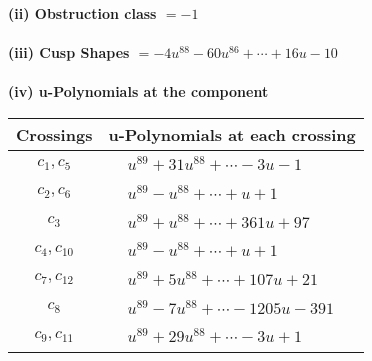 \documentclass[1p]{elsarticle_modified}
\theoremstyle{definition}
\begin{document}
\flushleft \textbf{(ii) Obstruction class $= -1$}\\~\\
\flushleft \textbf{(iii) Cusp Shapes $= -4 u^{88}-60 u^{86}+\cdots+16 u-10$}\\~\\
\newpage\renewcommand{\arraystretch}{1}
\flushleft \textbf{(iv) u-Polynomials at the component}\newline \\
\begin{tabular}{m{50pt}|m{274pt}}
Crossings & \hspace{64pt}u-Polynomials at each crossing \\
\hline $$\begin{aligned}c_{1},c_{5}\end{aligned}$$&$\begin{aligned}
&u^{89}+31 u^{88}+\cdots-3 u-1
\end{aligned}$\\
\hline $$\begin{aligned}c_{2},c_{6}\end{aligned}$$&$\begin{aligned}
&u^{89}- u^{88}+\cdots+u+1
\end{aligned}$\\
\hline $$\begin{aligned}c_{3}\end{aligned}$$&$\begin{aligned}
&u^{89}+u^{88}+\cdots+361 u+97
\end{aligned}$\\
\hline $$\begin{aligned}c_{4},c_{10}\end{aligned}$$&$\begin{aligned}
&u^{89}- u^{88}+\cdots+u+1
\end{aligned}$\\
\hline $$\begin{aligned}c_{7},c_{12}\end{aligned}$$&$\begin{aligned}
&u^{89}+5 u^{88}+\cdots+107 u+21
\end{aligned}$\\
\hline $$\begin{aligned}c_{8}\end{aligned}$$&$\begin{aligned}
&u^{89}-7 u^{88}+\cdots-1205 u-391
\end{aligned}$\\
\hline $$\begin{aligned}c_{9},c_{11}\end{aligned}$$&$\begin{aligned}
&u^{89}+29 u^{88}+\cdots-3 u+1
\end{aligned}$\\
\hline
\end{tabular}\\~\\
\end{document}
